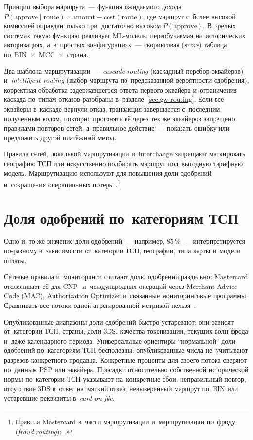 Принцип выбора маршрута~--- функция ожидаемого дохода $P(\text{approve} \mid
\text{route}) \times \text{amount} - \text{cost}(\text{route})$, где маршрут
с~более высокой комиссией оправдан только при~достаточно высоком
$P(\text{approve})$. В~зрелых системах такую функцию реализует ML-модель,
переобучаемая на~исторических авторизациях, а~в~простых конфигурациях~--- скоринговая
(\textit{score}) таблица по~BIN~$\times$~MCC~$\times$~страна.

Два шаблона маршрутизации~--- \textit{cascade routing} (каскадный перебор
эквайеров) и~\textit{intelligent routing} (выбор маршрута по~предсказанной
вероятности одобрения), корректная обработка задержавшегося ответа первого
эквайера и~ограничения каскада по~типам отказов разобраны
в~разделе~\ref{sec:gw-routing}. Если все
эквайеры в~каскаде вернули отказ, транзакция завершается с~последним полученным
кодом, повторно прогонять её через тех же эквайеров запрещено правилами
повторов сетей, а~правильное действие~--- показать ошибку или предложить другой
платёжный метод.

Правила сетей, локальной маршрутизации и~interchange запрещают маскировать
географию ТСП или искусственно подбирать маршрут под~выгодную тарифную модель.
Маршрутизацию используют для повышения доли одобрений и~сокращения
операционных потерь~\cite{visa-core-rules,mc-tpr}.\footnote{Правила Mastercard в~части маршрутизации и~маршрутизации по~фроду (\textit{fraud routing}):~\cite{mc-rules}.}

\section{Доля одобрений по~категориям ТСП}\label{sec:decline-benchmarks}

Одно и~то же значение доли одобрений~--- например, 85\,\%~--- интерпретируется
по-разному в~зависимости от~категории ТСП, географии, типа карты и~модели
оплаты.

Сетевые правила и~мониторинги считают долю одобрений раздельно: Mastercard отслеживает её для CNP-
и~международных операций через Merchant Advice Code (MAC), Authorization
Optimizer и~связанные мониторинговые программы. Сравнивать все потоки одной
агрегированной метрикой нельзя~\cite{mc-tpr}.

Опубликованные диапазоны доли одобрений быстро устаревают: они зависят
от~категории ТСП, страны, доли 3DS, качества токенизации, текущих волн
фрода и~даже календарного периода. Универсальные ориентиры
\enquote{нормальной} доли одобрений по~категориям ТСП бесполезны:
опубликованные числа не~учитывают разрезов конкретного продавца. Конкретные
проценты для своего потока сверяют по~данным PSP или эквайера. Просадки
относительно собственной исторической нормы по~категории ТСП указывают
на~конкретные сбои: неправильный повтор, отсутствие 3DS в~ответ на~мягкий отказ,
невыверенный маршрут по~BIN или устаревшие реквизиты в~\textit{card-on-file}.

